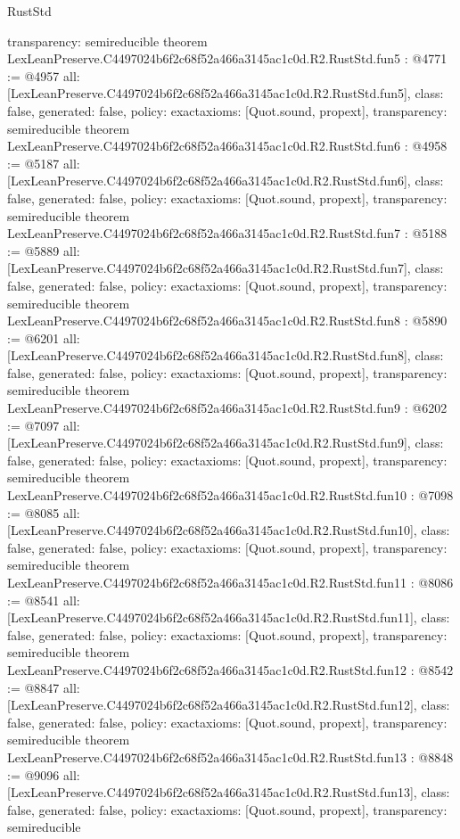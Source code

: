 \begin{lexlean}{RustStd}
\begin{coremodule}
{  transparency: semireducible
}
theorem LexLeanPreserve.C4497024b6f2c68f52a466a3145ac1c0d.R2.RustStd.fun5 : @4771 := @4957 {
  all: [LexLeanPreserve.C4497024b6f2c68f52a466a3145ac1c0d.R2.RustStd.fun5],
  class: false,
  generated: false,
  policy: exact{axioms: [Quot.sound, propext]},
  transparency: semireducible
}
theorem LexLeanPreserve.C4497024b6f2c68f52a466a3145ac1c0d.R2.RustStd.fun6 : @4958 := @5187 {
  all: [LexLeanPreserve.C4497024b6f2c68f52a466a3145ac1c0d.R2.RustStd.fun6],
  class: false,
  generated: false,
  policy: exact{axioms: [Quot.sound, propext]},
  transparency: semireducible
}
theorem LexLeanPreserve.C4497024b6f2c68f52a466a3145ac1c0d.R2.RustStd.fun7 : @5188 := @5889 {
  all: [LexLeanPreserve.C4497024b6f2c68f52a466a3145ac1c0d.R2.RustStd.fun7],
  class: false,
  generated: false,
  policy: exact{axioms: [Quot.sound, propext]},
  transparency: semireducible
}
theorem LexLeanPreserve.C4497024b6f2c68f52a466a3145ac1c0d.R2.RustStd.fun8 : @5890 := @6201 {
  all: [LexLeanPreserve.C4497024b6f2c68f52a466a3145ac1c0d.R2.RustStd.fun8],
  class: false,
  generated: false,
  policy: exact{axioms: [Quot.sound, propext]},
  transparency: semireducible
}
theorem LexLeanPreserve.C4497024b6f2c68f52a466a3145ac1c0d.R2.RustStd.fun9 : @6202 := @7097 {
  all: [LexLeanPreserve.C4497024b6f2c68f52a466a3145ac1c0d.R2.RustStd.fun9],
  class: false,
  generated: false,
  policy: exact{axioms: [Quot.sound, propext]},
  transparency: semireducible
}
theorem LexLeanPreserve.C4497024b6f2c68f52a466a3145ac1c0d.R2.RustStd.fun10 : @7098 := @8085 {
  all: [LexLeanPreserve.C4497024b6f2c68f52a466a3145ac1c0d.R2.RustStd.fun10],
  class: false,
  generated: false,
  policy: exact{axioms: [Quot.sound, propext]},
  transparency: semireducible
}
theorem LexLeanPreserve.C4497024b6f2c68f52a466a3145ac1c0d.R2.RustStd.fun11 : @8086 := @8541 {
  all: [LexLeanPreserve.C4497024b6f2c68f52a466a3145ac1c0d.R2.RustStd.fun11],
  class: false,
  generated: false,
  policy: exact{axioms: [Quot.sound, propext]},
  transparency: semireducible
}
theorem LexLeanPreserve.C4497024b6f2c68f52a466a3145ac1c0d.R2.RustStd.fun12 : @8542 := @8847 {
  all: [LexLeanPreserve.C4497024b6f2c68f52a466a3145ac1c0d.R2.RustStd.fun12],
  class: false,
  generated: false,
  policy: exact{axioms: [Quot.sound, propext]},
  transparency: semireducible
}
theorem LexLeanPreserve.C4497024b6f2c68f52a466a3145ac1c0d.R2.RustStd.fun13 : @8848 := @9096 {
  all: [LexLeanPreserve.C4497024b6f2c68f52a466a3145ac1c0d.R2.RustStd.fun13],
  class: false,
  generated: false,
  policy: exact{axioms: [Quot.sound, propext]},
  transparency: semireducible
}
\end{coremodule}
\end{lexlean}
